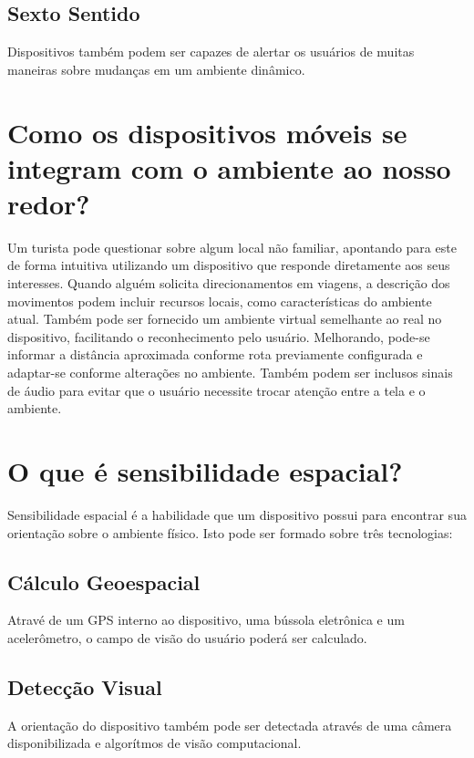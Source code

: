 \documentclass{article}
\begin{document}
\subsection{Sexto Sentido}

Dispositivos também podem ser capazes de alertar os usuários de muitas maneiras
sobre mudanças em um ambiente dinâmico.

\section{Como os dispositivos móveis se integram com o ambiente ao nosso redor?}

Um turista pode questionar sobre algum local não familiar, apontando para este
de forma intuitiva utilizando um dispositivo que responde diretamente aos seus
interesses. Quando alguém solicita direcionamentos em viagens, a descrição dos
movimentos podem incluir recursos locais, como características do ambiente
atual. Também pode ser fornecido um ambiente virtual semelhante ao real no
dispositivo, facilitando o reconhecimento pelo usuário. Melhorando, pode-se
informar a distância aproximada conforme rota previamente configurada e
adaptar-se conforme alterações no ambiente. Também podem ser inclusos sinais de
áudio para evitar que o usuário necessite trocar atenção entre a tela e o
ambiente.

\section{O que é sensibilidade espacial?}

Sensibilidade espacial é a habilidade que um dispositivo possui para encontrar
sua orientação sobre o ambiente físico. Isto pode ser formado sobre três
tecnologias:

\subsection{Cálculo Geoespacial}

Atravé de um GPS interno ao dispositivo, uma bússola eletrônica e um
acelerômetro, o campo de visão do usuário poderá ser calculado.

\subsection{Detecção Visual}

A orientação do dispositivo também pode ser detectada através de uma câmera
disponibilizada e algorítmos de visão computacional.
\end{document}
